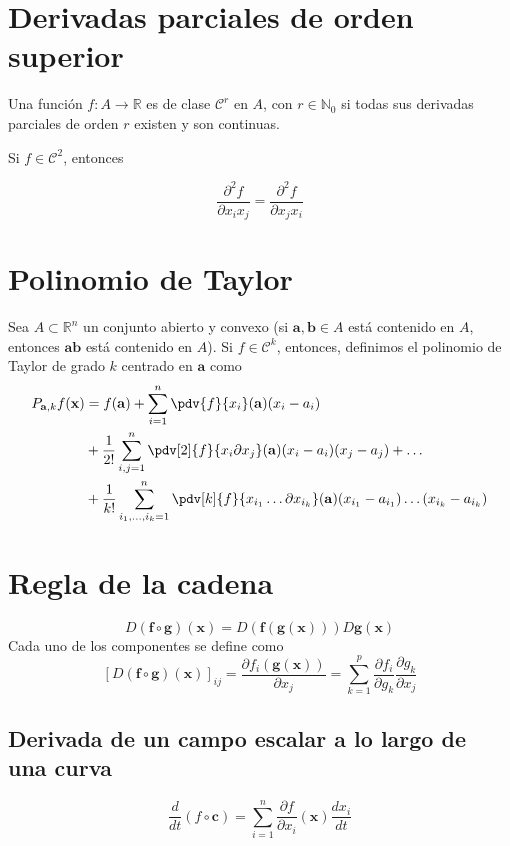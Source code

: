\documentclass{./Calculo.tex}
\begin{document}
\section{Derivadas parciales de orden superior}
\begin{defin}
Una función $f:A\to \mathbb{R}$ es de clase $\mathcal{C}^{r}$  en $A$, con $r \in \mathbb{N}_{0}$ si todas sus derivadas parciales de orden $r$ existen y son continuas.
\end{defin}
\begin{teorema}
Si $f\in \mathcal{C}^{2}$, entonces
 
$$
\frac{ \partial^{2}f }{ \partial x_{i}x_{j} } = \frac{ \partial^{2}f }{ \partial x_{j}x_{i} }  
$$
\end{teorema}
\section{Polinomio de Taylor}
Sea $A\subset \mathbb{R}^{n}$ un conjunto abierto y convexo (si $\mathbf{a},\mathbf{b}\in A$ está contenido en $A$, entonces $\mathbf{ab}$ está contenido en $A$). Si $f\in \mathcal{C}^{k}$, entonces, definimos el polinomio de Taylor de grado $k$ centrado en $\mathbf{a}$ como
\[
\]
\begin{equation}
	\begin{split}
		P_{\mathbf{a},k}f(\mathbf{x})&= f(\mathbf{a})+\sum_{i=1}^{n} \pdv{f}{x_{i}}(\mathbf{a})(x_{i}-a_{i})\\
									 &+\frac{1}{2!}\sum_{i,j=1}^{n} \pdv[2]{f}{x_{i}\partial x_{j}}(\mathbf{a})(x_{i}-a_{i})(x_{j}-a_{j})+\dots \\
									 &+\frac{1}{k!} \sum_{i_{1},\dots ,i_{k}=1}^{n}\pdv[k]{f}{x_{i_{1}}\dots \partial x_{i_{k}}}(\mathbf{a})(x_{i_{1}}-a_{i_{1}})\dots (x_{i_{k}}-a_{i_{k}})
	\end{split}
\end{equation}
\section{Regla de la cadena}

$$
D(\mathbf{f}\circ \mathbf{g})(\mathbf{x})=D(\mathbf{f}(\mathbf{g}(\mathbf{x})))D\mathbf{g}(\mathbf{x})
$$
Cada uno de los componentes se define como
$$
[D(\mathbf{f}\circ \mathbf{g})(\mathbf{x})]_{ij} = \frac{ \partial f_{i}(\mathbf{g}(\mathbf{x})) }{ \partial x_{j} }=\sum_{k=1}^{p} \frac{ \partial f_{i} }{ \partial g_{k} }\frac{ \partial g_{k} }{ \partial x_{j} }
$$
\subsection{Derivada de un campo escalar a lo largo de una curva}
$$
\frac{d}{dt} (f\circ \mathbf{c}) = \sum_{i=1}^{n} \frac{ \partial f }{ \partial x_{i} }(\mathbf{x}) \frac{d x_{i}}{dt}
$$
\end{document}

